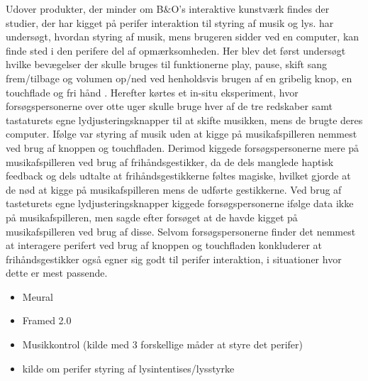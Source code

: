  Udover produkter, der minder om B$\&$O's interaktive kunstværk findes der studier, der har kigget på perifer interaktion til styring af musik og lys. \textcite{PDF:ComparingInputModalitiesForPeripheralInteraction} har undersøgt, hvordan styring af musik, mens brugeren sidder ved en computer, kan finde sted i den perifere del af opmærksomheden. Her blev det først undersøgt hvilke bevægelser der skulle bruges til funktionerne play, pause, skift sang frem/tilbage og volumen op/ned ved henholdsvis brugen af en gribelig knop, en touchflade og fri hånd \parencite[ss. 165-166]{PDF:ComparingInputModalitiesForPeripheralInteraction}. Herefter kørtes et in-situ eksperiment, hvor forsøgspersonerne over otte uger skulle bruge hver af de tre redskaber samt tastaturets egne lydjusteringsknapper til at skifte musikken, mens de brugte deres computer. Ifølge \textcite[ss. 172-173]{PDF:ComparingInputModalitiesForPeripheralInteraction} var styring af musik uden at kigge på musikafspilleren nemmest ved brug af knoppen og touchfladen. Derimod kiggede forsøgspersonerne mere på musikafspilleren ved brug af frihåndsgestikker, da de dels manglede haptisk feedback og dels udtalte at frihåndsgestikkerne føltes magiske, hvilket gjorde at de nød at kigge på musikafspilleren mens de udførte gestikkerne. Ved brug af tasteturets egne lydjusteringsknapper kiggede forsøgspersonerne ifølge data ikke på musikafspilleren, men sagde efter forsøget at de havde kigget på musikafspilleren ved brug af disse. Selvom forsøgspersonerne finder det nemmest at interagere perifert ved brug af knoppen og touchfladen konkluderer \textcite[s. 177]{PDF:ComparingInputModalitiesForPeripheralInteraction} at frihåndsgestikker også egner sig godt til perifer interaktion, i situationer hvor dette er mest passende.
 
  
 
 


%
\begin{itemize}
  \item Meural \parencite{WEB:Meural}
  \item Framed 2.0 
  \item Musikkontrol (kilde med 3 forskellige måder at styre det perifer)
  \item kilde om perifer styring af lysintentises/lysstyrke
\end{itemize}
